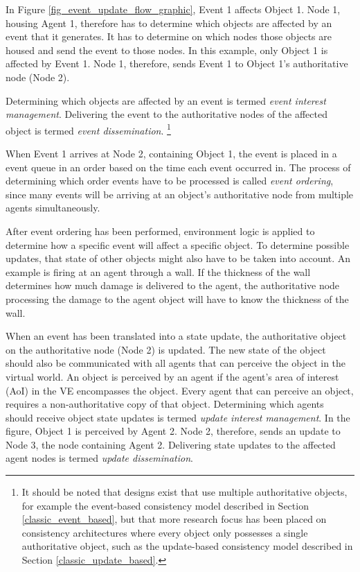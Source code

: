 In Figure \ref{fig_event_update_flow_graphic}, Event 1 affects Object 1. Node 1, housing Agent 1, therefore has to determine which objects are affected by an event that it generates. It has to determine on which nodes those objects are housed and send the event to those nodes. In this example, only Object 1 is affected by Event 1. Node 1, therefore, sends Event 1 to Object 1's authoritative node (Node 2).

Determining which objects are affected by an event is termed \emph{event interest management}. Delivering the event to the authoritative nodes of the affected object is termed \emph{event dissemination}. \footnote{It should be noted that designs exist that use multiple authoritative objects, for example the event-based consistency model described in Section \ref{classic_event_based}, but that more research focus has been placed on consistency architectures where every object only possesses a single authoritative object, such as the update-based consistency model described in Section \ref{classic_update_based}.}

When Event 1 arrives at Node 2, containing Object 1, the event is placed in a event queue in an order based on the time each event occurred in. The process of determining which order events have to be processed is called \emph{event ordering}, since many events will be arriving at an object's authoritative node from multiple agents simultaneously.

After event ordering has been performed, environment logic is applied to determine how a specific event will affect a specific object. To determine possible updates, that state of other objects might also have to be taken into account. An example is firing at an agent through a wall. If the thickness of the wall determines how much damage is delivered to the agent, the authoritative node processing the damage to the agent object will have to know the thickness of the wall.

When an event has been translated into a state update, the authoritative object on the authoritative node (Node 2) is updated. The new state of the object should also be communicated with all agents that can perceive the object in the virtual world. An object is perceived by an agent if the agent's area of interest (AoI)  in the VE encompasses the object. Every agent that can perceive an object, requires a non-authoritative copy of that object. Determining which agents should receive object state updates is termed \emph{update interest management}. In the figure, Object 1 is perceived by Agent 2. Node 2, therefore, sends an update to Node 3, the node containing Agent 2. Delivering state updates to the affected agent nodes is termed \emph{update dissemination}.

